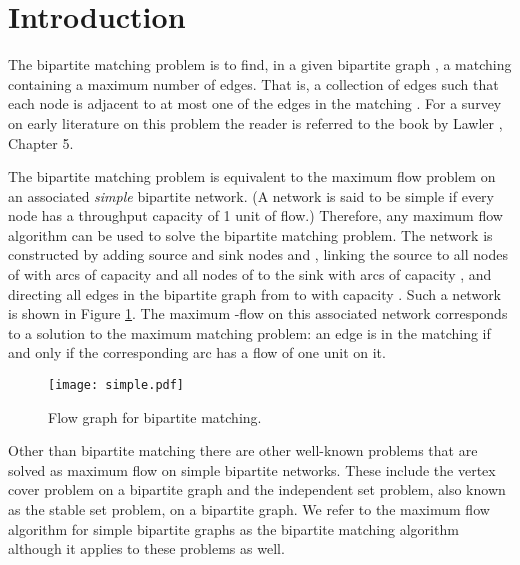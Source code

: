 \documentclass{article}
\begin{document}
\section{Introduction}

The bipartite matching problem is to find, in a given bipartite graph , a matching containing a maximum number of edges. That is, a collection of edges  such that each node is adjacent to at most one of the edges in the matching .  For a survey on early literature on this problem the reader is referred to the book by Lawler \cite{Law76}, Chapter 5.

The bipartite matching problem is equivalent to the maximum flow problem on an associated {\em simple} bipartite network. (A network is said to be simple if every node has a throughput capacity of 1 unit of flow.) Therefore, any maximum flow algorithm can be used to solve the bipartite matching problem. The network is constructed by adding source and sink nodes  and , linking the source to all nodes of  with arcs of capacity  and all nodes of  to the sink with arcs of capacity , and directing all edges in the bipartite graph from  to  with capacity . Such a network is shown in Figure \ref{fig:simple}. The maximum -flow on this associated network corresponds to a solution to the maximum matching problem: an edge  is in the matching if and only if the corresponding arc  has a flow of one unit on it.

\begin{figure}[ht]
\centerline{\texttt{[image: simple.pdf]}}
\caption{\label{fig:simple}Flow graph for bipartite matching.}
\end{figure}

Other than bipartite matching there are other well-known problems that are solved as maximum flow on simple bipartite networks.  These include the vertex cover problem on a bipartite graph and the independent set problem, also known as the stable set problem, on a bipartite graph. We refer to the maximum flow algorithm for simple bipartite graphs as the bipartite matching algorithm although it applies to these problems as well.
\end{document}

